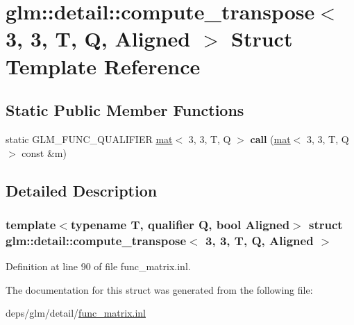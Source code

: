 \hypertarget{structglm_1_1detail_1_1compute__transpose_3_013_00_013_00_01T_00_01Q_00_01Aligned_01_4}{}\section{glm\+:\+:detail\+:\+:compute\+\_\+transpose$<$ 3, 3, T, Q, Aligned $>$ Struct Template Reference}
\label{structglm_1_1detail_1_1compute__transpose_3_013_00_013_00_01T_00_01Q_00_01Aligned_01_4}
\subsection*{Static Public Member Functions}
\begin{DoxyCompactItemize}
\item 
\mbox{\label{structglm_1_1detail_1_1compute__transpose_3_013_00_013_00_01T_00_01Q_00_01Aligned_01_4_a4eec6b706e425647b7e49b24312a7e8f}} 
static G\+L\+M\+\_\+\+F\+U\+N\+C\+\_\+\+Q\+U\+A\+L\+I\+F\+I\+ER \hyperlink{structglm_1_1mat}{mat}$<$ 3, 3, T, Q $>$ {\bfseries call} (\hyperlink{structglm_1_1mat}{mat}$<$ 3, 3, T, Q $>$ const \&m)
\end{DoxyCompactItemize}


\subsection{Detailed Description}
\subsubsection*{template$<$typename T, qualifier Q, bool Aligned$>$\newline
struct glm\+::detail\+::compute\+\_\+transpose$<$ 3, 3, T, Q, Aligned $>$}



Definition at line 90 of file func\+\_\+matrix.\+inl.



The documentation for this struct was generated from the following file\+:\begin{DoxyCompactItemize}
\item 
deps/glm/detail/\hyperlink{func__matrix_8inl}{func\+\_\+matrix.\+inl}\end{DoxyCompactItemize}
